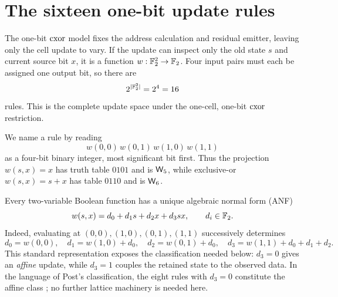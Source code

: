 \section{The sixteen one-bit update rules}\label{sec:wirings}

The one-bit $\mathrm{cxor}$ model fixes the address calculation and residual emitter, leaving only the
cell update to vary.  If the update can inspect only the old state $s$ and current source bit
$x$, it is a function $w:\mathbb{F}_2^2\to\mathbb{F}_2$.  Four input pairs must each be assigned one output bit, so
there are
\[
  2^{|\mathbb{F}_2^2|}=2^4=16
\]
rules.  This is the complete update space under the one-cell, one-bit $\mathrm{cxor}$ restriction.

We name a rule by reading
\[
  w(0,0)\,w(0,1)\,w(1,0)\,w(1,1)
\]
as a four-bit binary integer, most significant bit first.  Thus the projection $w(s,x)=x$ has
truth table $0101$ and is $\mathsf{W}_{5}$, while exclusive-or $w(s,x)=s+x$ has table $0110$ and is
$\mathsf{W}_{6}$.

Every two-variable Boolean function has a unique algebraic normal form (ANF)
\begin{equation}\label{eq:anf-new}
  w(s,x)=d_0+d_1s+d_2x+d_3sx,
  \qquad d_i\in\mathbb{F}_2 .
\end{equation}
Indeed, evaluating at $(0,0),(1,0),(0,1),(1,1)$ successively determines
\begin{equation}\label{eq:anf-coeff}
  d_0=w(0,0),\quad d_1=w(1,0)+d_0,\quad d_2=w(0,1)+d_0,
  \quad d_3=w(1,1)+d_0+d_1+d_2.
\end{equation}
This standard representation \cite{carlet2010boolean} exposes the classification needed below:
$d_3=0$ gives an \emph{affine} update, while $d_3=1$ couples the retained state to the observed
data.  In the language of Post's classification, the eight rules with $d_3=0$ constitute the
affine class \cite{post1941}; no further lattice machinery is needed here.

